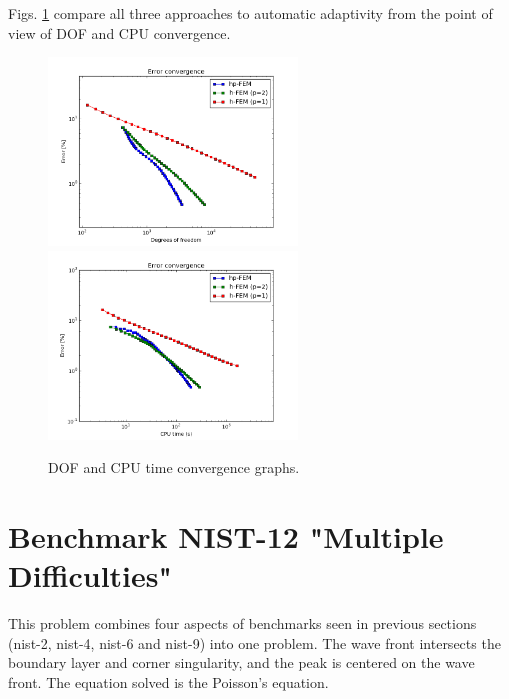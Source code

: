 \documentclass[12pt]{elsarticle}
\begin{document}
Figs. \ref{fig:nist-11-conv} compare all
three approaches to automatic adaptivity from the point
of view of DOF and CPU convergence.

\begin{figure}[!ht]
\centering
\includegraphics[height=5cm]{nist/nist-11/conv_dof_aniso.png}\ \
\includegraphics[height=5cm]{nist/nist-11/conv_cpu_aniso.png}
\caption{DOF and CPU time convergence graphs.}
\label{fig:nist-11-conv}
\end{figure}




\section{Benchmark NIST-12 "Multiple Difficulties"}
\label{sec:bench-12}

This problem combines four aspects of benchmarks
seen in previous sections (nist-2, nist-4, nist-6 and nist-9) into one problem.
The wave front intersects the boundary
layer and corner singularity, and the peak is centered on the wave front.
The equation solved is the Poisson's equation.
\end{document}
